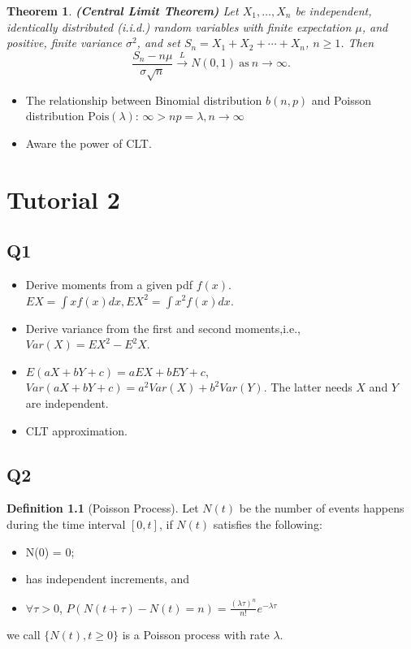 \documentclass[
]{book}
\providecommand{\tightlist}{%
  \setlength{\itemsep}{0pt}\setlength{\parskip}{0pt}}
\newtheorem{theorem}{Theorem}[chapter]
\theoremstyle{definition}
\newtheorem{definition}{Definition}[chapter]
\theoremstyle{definition}
\theoremstyle{definition}
\theoremstyle{remark}
\begin{document}
\begin{theorem}
\protect\hypertarget{thm:clt}{}{\label{thm:clt} }\textbf{(Central Limit Theorem)} Let \(X_1,\ldots,X_n\) be independent, identically
distributed (i.i.d.) random variables with finite expectation \(\mu\), and
positive, finite variance \(\sigma^2\), and set \(S_n=X_1 + X_2 + \cdots + X_n\), \(n \ge 1\). Then
\[
    \frac{S_n - n\mu}{\sigma \sqrt{n}}\xrightarrow{L} N(0, 1)
    ~\mathrm{as}~n\rightarrow\infty.
\]
\end{theorem}

\begin{itemize}
\item
  The relationship between Binomial distribution \(b(n,p)\) and Poisson distribution \(\mathrm{Pois}(\lambda)\): \(\infty > np = \lambda, n\rightarrow\infty\)
\item
  Aware the power of CLT.
\end{itemize}

\hypertarget{sec:T2}{%
\chapter{Tutorial 2}\label{sec:T2}}

\hypertarget{q1}{%
\section{Q1}\label{q1}}

\begin{itemize}
\item
  Derive moments from a given pdf \(f(x)\). \(EX = \int xf(x)dx, EX^2=\int x^2f(x)dx\).
\item
  Derive variance from the first and second moments,i.e., \(Var(X)=EX^2-E^2X\).
\item
  \(E(aX+bY+c) = aEX + bEY+c\), \(Var(aX+bY+c) = a^2Var(X)+b^2Var(Y)\). The latter needs \(X\) and \(Y\) are independent.
\item
  CLT approximation.
\end{itemize}

\hypertarget{q2}{%
\section{Q2}\label{q2}}

\begin{definition}[Poisson Process]
\protect\hypertarget{def:unnamed-chunk-1}{}{\label{def:unnamed-chunk-1} \iffalse (Poisson Process) \fi{} }Let \(N(t)\) be the number of events happens during the time interval \([0,t]\), if \(N(t)\) satisfies the following:

\begin{itemize}
\tightlist
\item
  N(0) = 0;
\item
  has independent increments, and
\item
  \(\forall \tau>0\), \(P(N(t+\tau)-N(t) = n)= \frac{(\lambda \tau)^n}{n!}e^{-\lambda \tau}\)
\end{itemize}

we call \(\{N(t),t\geq0\}\) is a Poisson process with rate \(\lambda\).
\end{definition}
\end{document}
